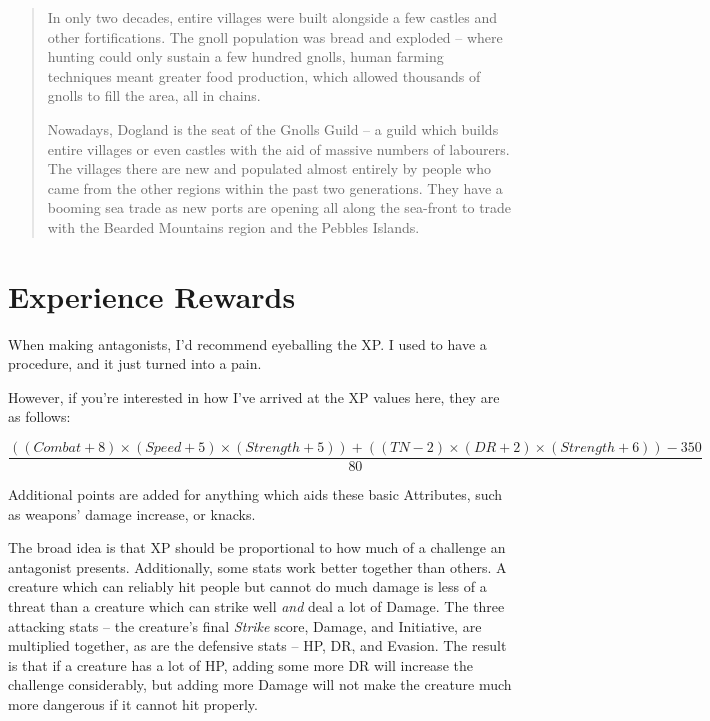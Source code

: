 \begin{quotation}
	In only two decades, entire villages were built alongside a few castles and other fortifications.  The gnoll population was bread and exploded -- where hunting could only sustain a few hundred gnolls, human farming techniques meant greater food production, which allowed thousands of gnolls to fill the area, all in chains.

	Nowadays, Dogland is the seat of the Gnolls Guild -- a guild which builds entire villages or even castles with the aid of massive numbers of labourers.  The villages there are new and populated almost entirely by people who came from the other regions within the past two generations.  They have a booming sea trade as new ports are opening all along the sea-front to trade with the Bearded Mountains region and the Pebbles Islands.
\end{quotation}

\chapter{Experience Rewards}

When making antagonists, I'd recommend eyeballing the XP.  I used to have a procedure, and it just turned into a pain.

However, if you're interested in how I've arrived at the XP values here, they are as follows:

\begin{equation}
\frac{(( Combat + 8 ) \times ( Speed + 5) \times ( Strength + 5 ) ) + ( ( TN -2 ) \times ( DR + 2 ) \times ( Strength + 6 )) - 350}{80}
\end{equation}

Additional points are added for anything which aids these basic Attributes, such as weapons' damage increase, or knacks.\label{lastpage}

The broad idea is that XP should be proportional to how much of a challenge an antagonist presents.  Additionally, some stats work better together than others.  A creature which can reliably hit people but cannot do much damage is less of a threat than a creature which can strike well \emph{and} deal a lot of Damage.  The three attacking stats -- the creature's final \textit{Strike} score, Damage, and Initiative, are multiplied together, as are the defensive stats -- HP, DR, and Evasion.  The result is that if a creature has a lot of HP, adding some more DR will increase the challenge considerably, but adding more Damage will not make the creature much more dangerous if it cannot hit properly.

